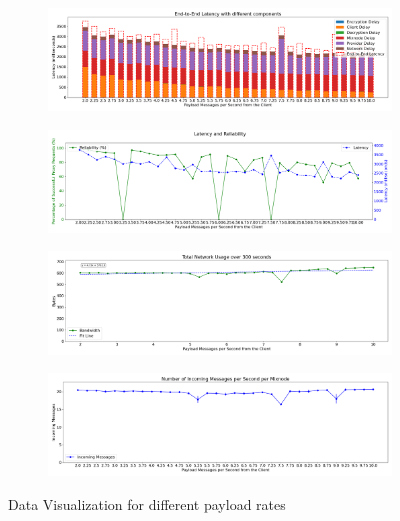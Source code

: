 \documentclass[a4paper,11pt,oneside]{report}
\begin{document}
\begin{figure}[htbp]
    \centering
    \begin{subfigure}{\textwidth}
        \centering
        \includegraphics[width=\textwidth]{plots/lambdas_latency_components.png}
        \caption{}
        \label{fig:lambdas_latency}
    \end{subfigure}
    \hfill
    \centering
    \begin{subfigure}{\textwidth}
        \centering
        \includegraphics[width=\textwidth]{plots/lambdas_reliability_latency.png}
        \caption{}
        \label{fig:lambdas_realibility}
    \end{subfigure}
    \hfill
    \begin{subfigure}{\textwidth}
        \centering
        \includegraphics[width=\textwidth]{plots/lambdas_bandwidth.png}
        \caption{}
        \label{fig:lambdas_bandwidth}
    \end{subfigure}
    \hfill
    \begin{subfigure}{\textwidth}
        \centering
        \includegraphics[width=\textwidth]{plots/lambdas_incoming_messages.png}
        \caption{}
        \label{fig:lambdas_messages}
    \end{subfigure}
    \caption{Data Visualization for different payload rates}
\end{figure}
\end{document}

